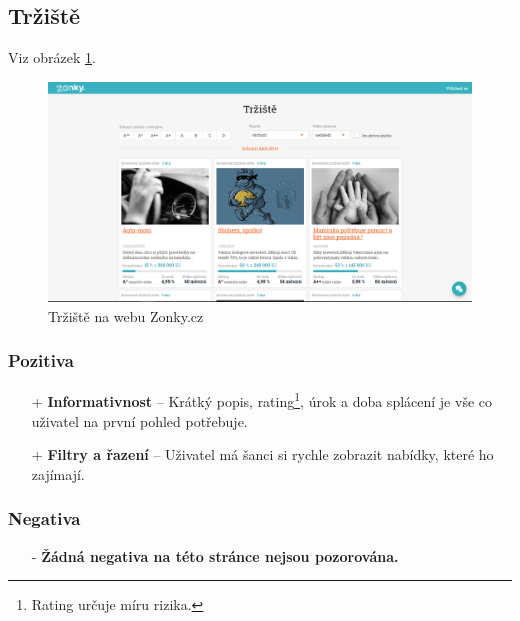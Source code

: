 \newpage
\subsection{Tržiště}
Viz obrázek \ref{fig:zonky:marketplace}.
\begin{figure}[h]
    \centering
    \includegraphics[width=1.0\textwidth]{media/zonky/marketplace.png}
    \caption{Tržiště na webu Zonky.cz}
    \label{fig:zonky:marketplace}
\end{figure}
\subsubsection*{Pozitiva}
\begin{itemize}
    \item[+] \textbf{Informativnost} -- Krátký popis, rating\footnote{Rating určuje míru rizika.}, úrok a doba splácení je vše co uživatel na první pohled potřebuje.
    \item[+] \textbf{Filtry a řazení} -- Uživatel má šanci si rychle zobrazit nabídky, které ho zajímají.
\end{itemize}
\subsubsection*{Negativa}
\begin{itemize}
    \item[-] \textbf{Žádná negativa na této stránce nejsou pozorována.}
\end{itemize}



\newpage
